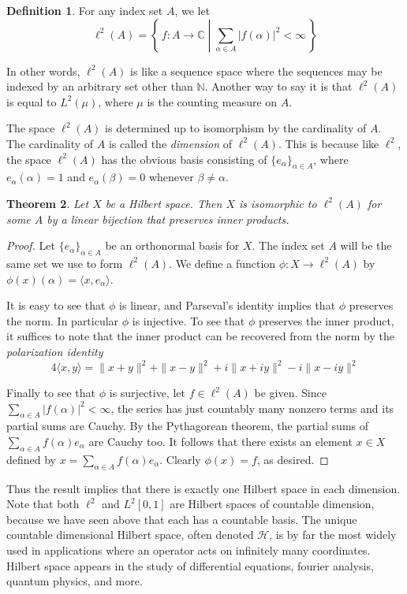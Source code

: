 \documentclass[11pt,oneside]{amsbook}
\newcommand{\set}[1]{\left\{\,#1\,\right\}}
\newcommand{\NN}{{\mathbb N}}
\newcommand{\CC}{{\mathbb C}}
\theoremstyle{definition}
\theoremstyle{plain}
\newtheorem{thm}{Theorem}[section]
\theoremstyle{definition}
\newtheorem{defn}[thm]{Definition}
\theoremstyle{remark}
\numberwithin{equation}{section}
\numberwithin{figure}{section}
\begin{document}
\begin{defn}
  For any index set $A$, we let
  \[\ell^2(A)=\set{f\colon A\to\CC\;\left|\;\sum_{\alpha\in A}|f(\alpha)|^2<\infty\right.}
  \]
\end{defn}

In other words, $\ell^2(A)$ is like a sequence space where the sequences may be indexed by an arbitrary set other than $\NN$. Another way to say it is that $\ell^2(A)$ is equal to $L^2(\mu)$, where $\mu$ is the counting measure on $A$.

The space $\ell^2(A)$ is determined up to isomorphism by the cardinality of $A$. The cardinality of $A$ is called the \emph{dimension} of $\ell^2(A)$. This is because like $\ell^2$, the space $\ell^2(A)$ has the obvious basis consisting of $\{e_\alpha\}_{\alpha\in A}$, where $e_\alpha(\alpha)=1$ and $e_\alpha(\beta)=0$ whenever $\beta\neq\alpha$.

\begin{thm}
  Let $X$ be a Hilbert space. Then $X$ is isomorphic to $\ell^2(A)$ for some $A$ by a linear bijection that preserves inner products.
\end{thm}

\begin{proof}
  Let $\{e_\alpha\}_{\alpha\in A}$ be an orthonormal basis for $X$. The index set $A$ will be the same set we use to form $\ell^2(A)$. We define a function $\phi\colon X\to\ell^2(A)$ by $\phi(x)(\alpha)=\langle x,e_\alpha\rangle$.

  It is easy to see that $\phi$ is linear, and Parseval's identity implies that $\phi$ preserves the norm. In particular $\phi$ is injective. To see that $\phi$ preserves the inner product, it suffices to note that the inner product can be recovered from the norm by the \emph{polarization identity}
  \[4\langle x,y\rangle=\|x+y\|^2+\|x-y\|^2+i\|x+iy\|^2-i\|x-iy\|^2
  \]

  Finally to see that $\phi$ is surjective, let $f\in\ell^2(A)$ be given. Since $\sum_{\alpha\in A}|f(\alpha)|^2<\infty$, the series has just countably many nonzero terms and its partial sums are Cauchy. By the Pythagorean theorem, the partial sums of $\sum_{\alpha\in A}f(\alpha)e_\alpha$ are Cauchy too. It follows that there exists an element $x\in X$ defined by $x=\sum_{\alpha\in A}f(\alpha)e_\alpha$. Clearly $\phi(x)=f$, as desired.
\end{proof}

Thus the result implies that there is exactly one Hilbert space in each dimension. Note that both $\ell^2$ and $L^2[0,1]$ are Hilbert spaces of countable dimension, because we have seen above that each has a countable basis. The unique countable dimensional Hilbert space, often denoted $\mathcal H$, is by far the most widely used in applications where an operator acts on infinitely many coordinates. Hilbert space appears in the study of differential equations, fourier analysis, quantum physics, and more.
\end{document}
